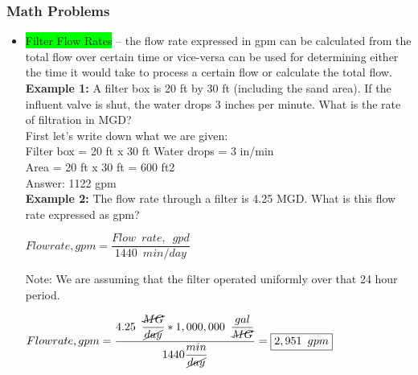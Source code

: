 \subsubsection{Math Problems}
\begin{itemize}
\item \colorbox{lime}{Filter Flow Rates} – the flow rate expressed in gpm can be calculated from the total flow over certain time or vice-versa can be used for determining either the time it would take to process a certain flow or calculate the total flow.\\

 

 

\textbf{Example 1:}  A filter box is 20 ft by 30 ft (including the sand area). If the influent valve is shut, the water drops 3 inches per minute. What is the rate of filtration in MGD?\\

First let's write down what we are given:\\

 

Filter box = 20 ft x 30 ft Water drops = 3 in/min\\

Area = 20 ft x 30 ft = 600 ft2\\

Answer:  1122 gpm\\

 

 

\textbf{Example 2:}  The flow rate through a filter is 4.25 MGD. What is this flow rate expressed as gpm?\\

\vspace{0.2cm}

$Flow rate, gpm=\dfrac{Flow \enspace rate, \enspace gpd}{1440 \enspace min/day}$\\

\vspace{0.2cm}

Note:  We are assuming that the filter operated uniformly over that 24 hour period.\\

\vspace{0.3cm}

$Flow rate, gpm=\dfrac{4.25 \enspace \dfrac{\cancel{MG}}{\cancel{day}} *1,000,000 \enspace \dfrac{gal}{\cancel{MG}}}{1440\dfrac{min}{\cancel{day}}}=\boxed{2,951 \enspace gpm}$


\end{itemize}

